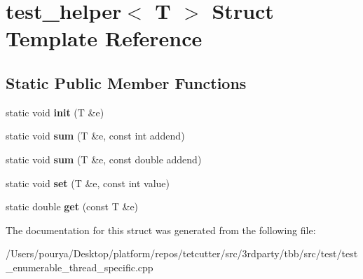 \hypertarget{structtest__helper}{}\section{test\+\_\+helper$<$ T $>$ Struct Template Reference}
\label{structtest__helper}
\subsection*{Static Public Member Functions}
\begin{DoxyCompactItemize}
\item 
\hypertarget{structtest__helper_a7fed4ec7963c2ad696e70319f90ac27b}{}static void {\bfseries init} (T \&e)\label{structtest__helper_a7fed4ec7963c2ad696e70319f90ac27b}

\item 
\hypertarget{structtest__helper_a12d92a6472a503811fe6328cd01dc710}{}static void {\bfseries sum} (T \&e, const int addend)\label{structtest__helper_a12d92a6472a503811fe6328cd01dc710}

\item 
\hypertarget{structtest__helper_a8c9601b18f6e44f354b14bbda83763a9}{}static void {\bfseries sum} (T \&e, const double addend)\label{structtest__helper_a8c9601b18f6e44f354b14bbda83763a9}

\item 
\hypertarget{structtest__helper_aef5c78e69c59a510e20be4bcb6fc0928}{}static void {\bfseries set} (T \&e, const int value)\label{structtest__helper_aef5c78e69c59a510e20be4bcb6fc0928}

\item 
\hypertarget{structtest__helper_ab77aaba6119f16a9eb5125f94d8d7317}{}static double {\bfseries get} (const T \&e)\label{structtest__helper_ab77aaba6119f16a9eb5125f94d8d7317}

\end{DoxyCompactItemize}


The documentation for this struct was generated from the following file\+:\begin{DoxyCompactItemize}
\item 
/\+Users/pourya/\+Desktop/platform/repos/tetcutter/src/3rdparty/tbb/src/test/test\+\_\+enumerable\+\_\+thread\+\_\+specific.\+cpp\end{DoxyCompactItemize}
